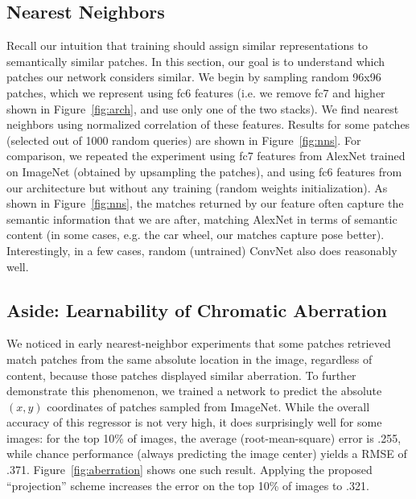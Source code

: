 \documentclass[10pt,twocolumn,letterpaper]{article}
\begin{document}
\subsection{Nearest Neighbors}\label{sec:nns}
\vspace{-0.05in}
Recall our intuition that training should assign similar representations to semantically similar patches.  In this section, our goal is to understand which patches our network considers similar.
We begin by sampling random 96x96 patches, which we represent using fc6 features (i.e. we remove fc7 and higher shown in Figure~\ref{fig:arch}, and use only one of the two stacks).  We find nearest neighbors using normalized correlation of these features.  Results for some patches (selected out of 1000 random queries) are shown in Figure~\ref{fig:nns}.
For comparison, we repeated the experiment using fc7 features from AlexNet trained on ImageNet (obtained by upsampling the patches), and using fc6 features from our architecture but without any training (random weights initialization).  As shown in Figure~\ref{fig:nns}, the matches returned by our feature often capture the semantic information that we are after, matching AlexNet in terms of semantic content (in some cases, e.g. the car wheel, our matches capture pose better). Interestingly, in a few cases, random (untrained) ConvNet also does reasonably well.  






\vspace{-0.05in}
\subsection{Aside: Learnability of Chromatic Aberration}\label{sec:aberration}
\vspace{-0.05in}
We noticed in early nearest-neighbor experiments that some patches retrieved match patches from the same absolute location in the image, regardless of content, because those patches displayed similar aberration.  %
To further demonstrate this phenomenon, we trained a network 
to predict the absolute $(x,y)$ coordinates of patches sampled from ImageNet. While the overall accuracy of this regressor is not very high, it does surprisingly well for some images: for the top 10\% of images, the average (root-mean-square) error is .255, while chance performance (always predicting the image center) yields a RMSE of .371.  Figure~\ref{fig:aberration} shows one such result. %
Applying the proposed ``projection'' scheme increases the error on the top 10\% of images to .321.  
\end{document}
